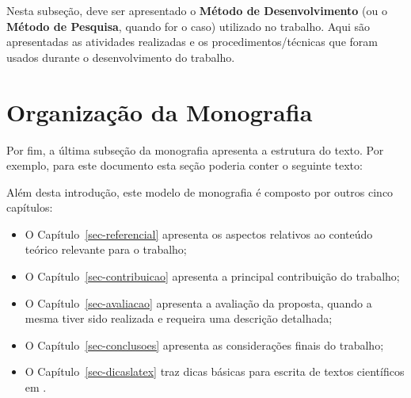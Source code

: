 Nesta subseção, deve ser apresentado o \textbf{Método de Desenvolvimento} (ou o \textbf{Método de Pesquisa}, quando for o caso) utilizado no trabalho. Aqui são apresentadas as atividades realizadas e os procedimentos/técnicas que foram usados durante o desenvolvimento do trabalho.


\section{Organização da Monografia}
\label{sec-intro-organizacao}

Por fim, a última subseção da monografia apresenta a estrutura do texto. Por exemplo, para este documento esta seção poderia conter o seguinte texto:

Além desta introdução, este modelo de monografia é composto por outros cinco capítulos:

\begin{itemize}
	\item O Capítulo~\ref{sec-referencial} apresenta os aspectos relativos ao conteúdo teórico relevante para o trabalho;
	
	\item O Capítulo~\ref{sec-contribuicao} apresenta a principal contribuição do trabalho;
	
	\item O Capítulo~\ref{sec-avaliacao} apresenta a avaliação da proposta, quando a mesma tiver sido realizada e requeira uma descrição detalhada;
	
	\item O Capítulo~\ref{sec-conclusoes} apresenta as considerações finais do trabalho;
	
	\item O Capítulo~\ref{sec-dicaslatex} traz dicas básicas para escrita de textos científicos em \latex.
\end{itemize}


